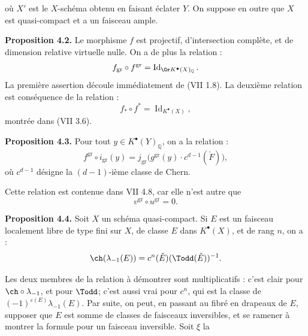 où \(X'\) est le \(X\)-schéma
obtenu en faisant éclater \(Y\). On suppose en outre que \(X\) est quasi-compact et a un faisceau ample.

\textbf{Proposition 4.2.} Le morphisme \(f\) est projectif, d'intersection complète, et de dimension relative virtuelle nulle. On a de plus la relation :
\[
 f_{\mathrm{gr}}\circ f^{\mathrm{gr}}=\operatorname{Id}_{\Gr K^{\bullet}(X)_{\mathbb Q}} .
\]
La première assertion découle immédiatement de (VII 1.8). La deuxième relation est conséquence de la relation :
\[
 f_*\circ f^*=\operatorname{Id}_{K^{\bullet}(X)},
\]
montrée dans (VII 3.6).

\textbf{Proposition 4.3.} Pour tout \(y\in K^{\bullet}(Y)_{\mathbb Q}\), on a la relation :
\[
 f^{\mathrm{gr}}\circ i_{\mathrm{gr}}(y)
 =
 j_{\mathrm{gr}}\bigl(g^{\mathrm{gr}}(y)\cdot c^{d-1}(\check F)\bigr),
\]
où \(c^{d-1}\) désigne la \((d-1)\)-ième classe de Chern.

Cette relation est contenue dans VII 4.8, car elle n'est autre que
\[
 v^{\mathrm{gr}}\circ u^{\mathrm{gr}}=0 .
\]

\textbf{Proposition 4.4.} Soit \(X\) un schéma quasi-compact. Si \(E\) est un faisceau localement libre de type fini sur \(X\), de classe \(E\) dans \(K^{\bullet}(X)\), et de rang \(n\), on a :
\[
 \ch(\lambda_{-1}(E))=c^n(\check E)(\Todd(\check E))^{-1}.
\]

Les deux membres de la relation à démontrer sont multiplicatifs : c'est clair pour \(\ch\circ\lambda_{-1}\), et pour \(\Todd\); c'est aussi vrai pour \(c^n\), qui est la classe de \((-1)^{\varepsilon(E)}\lambda_{-1}(E)\). Par suite, on peut, en passant au fibré en drapeaux de \(E\), supposer que \(E\) est somme de classes de faisceaux inversibles, et se ramener à montrer la formule pour un faisceau inversible. Soit \(\xi\) la
